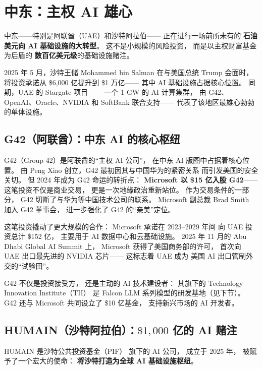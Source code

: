\section{中东：主权 AI 雄心}
\label{sec:global-middle-east}

中东——特别是阿联酋（UAE）和沙特阿拉伯——
正在进行一场前所未有的
\textbf{石油美元向 AI 基础设施的大转型}。
这不是小规模的风险投资，
而是以主权财富基金为后盾的
\textbf{数百亿美元级}的基础设施赌注。

2025 年 5 月，沙特王储 Mohammed bin Salman
在与美国总统 Trump 会面时，
将投资承诺从 \$6,000 亿提升到 \$1 万亿——
其中 AI 基础设施占据核心位置。
同期，UAE 的 Stargate 项目——
一个 1 GW 的 AI 计算集群，
由 G42、OpenAI、Oracle、NVIDIA 和 SoftBank 联合支持——
代表了该地区最雄心勃勃的单体设施。

\subsection{G42（阿联酋）：中东 AI 的核心枢纽}

G42（Group 42）是阿联酋的``主权 AI 公司''，
在中东 AI 版图中占据着核心位置。
由 Peng Xiao 创立，G42 最初因其与中国华为的紧密关系
而引发美国的安全关切。
但 2024 年成为 G42 命运的转折点：
\textbf{Microsoft 以 \$15 亿入股 G42}——
这笔投资不仅是商业交易，
更是一次地缘政治重新站位。
作为交易条件的一部分，
G42 切断了与华为等中国技术公司的联系。
Microsoft 副总裁 Brad Smith 加入 G42 董事会，
进一步强化了 G42 的``亲美''定位。

这笔投资撬动了更大规模的合作：
Microsoft 承诺在 2023--2029 年间
向 UAE 投资总计 \$152 亿，
主要用于 AI 数据中心和云基础设施。
2025 年 11 月的 Abu Dhabi Global AI Summit 上，
Microsoft 获得了美国商务部的许可，
首次向 UAE 出口最先进的 NVIDIA 芯片——
这标志着 UAE 成为
美国 AI 出口管制外交的``试验田''。

G42 不仅是投资接受方，
还是主动的 AI 技术建设者：
其旗下的 Technology Innovation Institute（TII）
是 Falcon LLM 系列模型的研发基地（见下节）。
G42 还与 Microsoft 共同设立了 \$10 亿基金，
支持新兴市场的 AI 开发者。

\subsection{HUMAIN（沙特阿拉伯）：$\$1,000$ 亿的 AI 赌注}

HUMAIN 是沙特公共投资基金（PIF）
旗下的 AI 公司，
成立于 2025 年，
被赋予了一个宏大的使命：
\textbf{将沙特打造为全球 AI 基础设施枢纽}。

